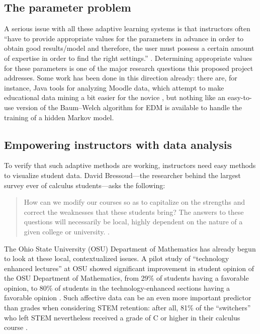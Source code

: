 \documentclass[12pt]{article}
\begin{document}
\subsection{The parameter problem}

A serious issue with all these adaptive learning systems is that
instructors often ``have to provide appropriate values for the
parameters in advance in order to obtain good results/model and
therefore, the user must possess a certain amount of expertise in
order to find the right settings.'' \parencite{romero2010educational}.
Determining appropriate values for these parameters is one of the
major research questions this proposed project addresses.  Some work
has been done in this direction already: there are, for instance, Java
tools for analyzing Moodle data, which attempt to make educational
data mining a bit easier for the novice \parencite{java-data-mining},
but nothing like an easy-to-use version of the Baum--Welch algorithm
for EDM is available to handle the training of a hidden Markov model.

\subsection{Empowering instructors with data analysis}

To verify that such adaptive methods are working, instructors need
easy methods to visualize student data.  David Bressoud---the
researcher behind the largest survey ever of calculus students---asks
the following:
\begin{quote}
  How can we modify our courses so as to capitalize on the strengths
  and correct the weaknesses that these students bring?  The answers
  to these questions will necessarily be local, highly dependent on
  the nature of a given college or
  university. \parencite{bressoud-sky-falling}.
\end{quote}
The Ohio State University (OSU) Department of Mathematics has already
begun to look at these local, contextualized issues.  A pilot study of
``technology enhanced lectures'' at OSU showed significant improvement
in student opinion of the OSU Department of Mathematics, from 29\% of
students having a favorable opinion, to 80\% of students in the
technology-enhanced sections having a favorable opinion
\cite{miller-tech-enhanced-calculus}.  Such affective data can be an
even more important predictor than grades when considering STEM
retention: after all, 81\% of the ``switchers'' who left STEM
nevertheless received a grade of C or higher in their calculus course
\cite{calculus-programs}.
\end{document}
